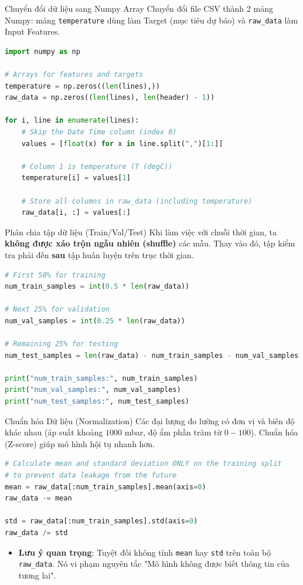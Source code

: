 \documentclass[aspectratio=169]{beamer}
\begin{document}
\begin{frame}[fragile]{Chuyển đổi dữ liệu sang Numpy Array}
Chuyển đổi file CSV thành 2 mảng Numpy: mảng \texttt{temperature} dùng làm Target (mục tiêu dự báo) và \texttt{raw\_data} làm Input Features.
\begin{lstlisting}[language=Python]
import numpy as np

# Arrays for features and targets
temperature = np.zeros((len(lines),))
raw_data = np.zeros((len(lines), len(header) - 1))

for i, line in enumerate(lines):
    # Skip the Date Time column (index 0)
    values = [float(x) for x in line.split(",")[1:]]
    
    # Column 1 is temperature (T (degC))
    temperature[i] = values[1]
    
    # Store all columns in raw_data (including temperature)
    raw_data[i, :] = values[:]
\end{lstlisting}
\end{frame}

\begin{frame}[fragile]{Phân chia tập dữ liệu (Train/Val/Test)}
Khi làm việc với chuỗi thời gian, ta \textbf{không được xáo trộn ngẫu nhiên (shuffle)} các mẫu. Thay vào đó, tập kiểm tra phải đến \textbf{sau} tập huấn luyện trên trục thời gian.
\begin{lstlisting}[language=Python]
# First 50% for training
num_train_samples = int(0.5 * len(raw_data))

# Next 25% for validation
num_val_samples = int(0.25 * len(raw_data))

# Remaining 25% for testing
num_test_samples = len(raw_data) - num_train_samples - num_val_samples

print("num_train_samples:", num_train_samples)
print("num_val_samples:", num_val_samples)
print("num_test_samples:", num_test_samples)
\end{lstlisting}
\end{frame}

\begin{frame}[fragile]{Chuẩn hóa Dữ liệu (Normalization)}
Các đại lượng đo lường có đơn vị và biên độ khác nhau (áp suất khoảng $1000$ mbar, độ ẩm phần trăm từ $0-100$). Chuẩn hóa (Z-score) giúp mô hình hội tụ nhanh hơn.
\begin{lstlisting}[language=Python]
# Calculate mean and standard deviation ONLY on the training split
# to prevent data leakage from the future
mean = raw_data[:num_train_samples].mean(axis=0)
raw_data -= mean

std = raw_data[:num_train_samples].std(axis=0)
raw_data /= std
\end{lstlisting}
\begin{itemize}
    \item \textbf{Lưu ý quan trọng}: Tuyệt đối không tính \texttt{mean} hay \texttt{std} trên toàn bộ \texttt{raw\_data}. Nó vi phạm nguyên tắc "Mô hình không được biết thông tin của tương lai".
\end{itemize}
\end{frame}
\end{document}
